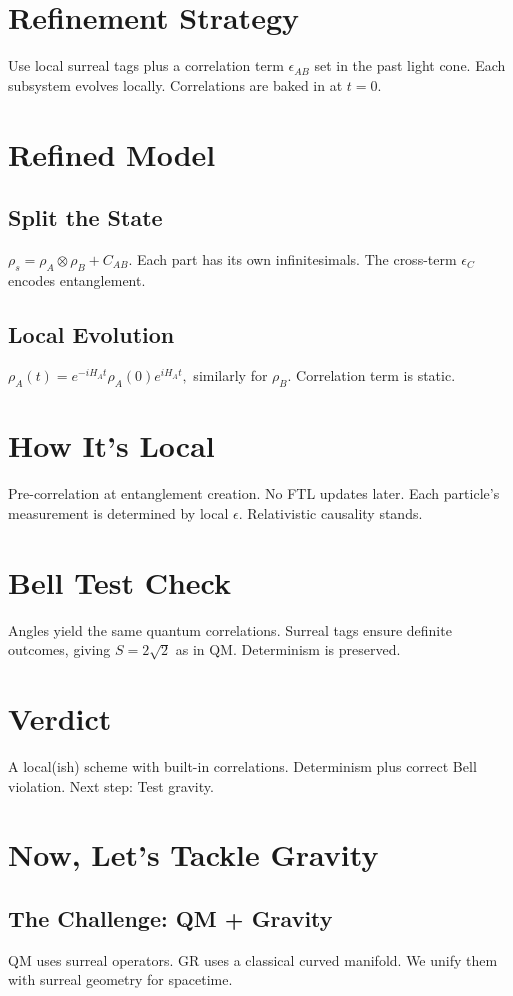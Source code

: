 \documentclass{article}
\begin{document}
\section{Refinement Strategy}
Use local surreal tags plus a correlation term \(\epsilon_{AB}\) set in the past light cone. Each subsystem evolves locally. Correlations are baked in at \(t=0\).

\section{Refined Model}
\subsection{Split the State}
\(\rho_s = \rho_A \otimes \rho_B + C_{AB}\). Each part has its own infinitesimals. The cross-term \(\epsilon_C\) encodes entanglement.

\subsection{Local Evolution}
\(\rho_A(t) = e^{-iH_A t}\rho_A(0) e^{iH_A t},\) similarly for \(\rho_B\). Correlation term is static.

\section{How It's Local}
Pre-correlation at entanglement creation. No FTL updates later. Each particle's measurement is determined by local \(\epsilon\). Relativistic causality stands.

\section{Bell Test Check}
Angles yield the same quantum correlations. Surreal tags ensure definite outcomes, giving \(S=2\sqrt{2}\) as in QM. Determinism is preserved.

\section{Verdict}
A local(ish) scheme with built-in correlations. Determinism plus correct Bell violation. Next step: Test gravity.

\section{Now, Let's Tackle Gravity}
\subsection{The Challenge: QM + Gravity}
QM uses surreal operators. GR uses a classical curved manifold. We unify them with surreal geometry for spacetime.
\end{document}
